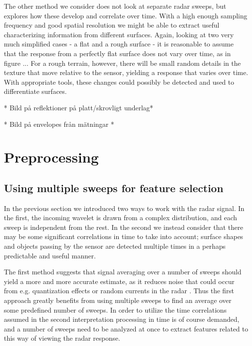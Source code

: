 The other method we consider does not look at separate radar sweeps, but explores how these develop and correlate over time. With a high enough sampling frequency and good spatial resolution we might be able to extract useful characterizing information from different surfaces. Again, looking at two very much simplified cases - a flat and a rough surface - it is reasonable to assume that the response from a perfectly flat surface does not vary over time, as in figure ... For a rough terrain, however, there will be small random details in the texture that move relative to the sensor, yielding a response that varies over time. With appropriate tools, these changes could possibly be detected and used to differentiate surfaces.

* Bild på reflektioner på platt/skrovligt underlag*

* Bild på envelopes från mätningar *


\section{Preprocessing}

\subsection{Using multiple sweeps for feature selection}
\label{multsweep}
In the previous section we introduced two ways to work with the radar signal. In the first, the incoming wavelet is drawn from a complex distribution, and each sweep is independent from the rest. In the second we instead consider that there may be some significant correlations in time to take into account; surface shapes and objects passing by the sensor are detected multiple times in a perhaps predictable and useful manner.  

The first method suggests that signal averaging over a number of sweeps should yield a more and more accurate estimate, as it reduces noise that could occur from e.g. quantization effects or random currents in the radar \citep{w_doerry_2016}. Thus the first approach greatly benefits from using multiple sweeps to find an average over some predefined number of sweeps.  In order to utilize the time correlations assumed in the second interpretation processing in time is of course demanded, and a number of sweeps need to be analyzed at once to extract features related to this way of viewing the radar response. 

